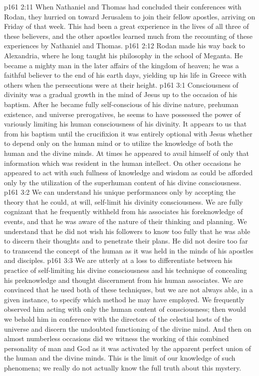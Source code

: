 \vs p161 2:11 \pc When Nathaniel and Thomas had concluded their conferences with Rodan, they hurried on toward Jerusalem to join their fellow apostles, arriving on Friday of that week. This had been a great experience in the lives of all three of these believers, and the other apostles learned much from the recounting of these experiences by Nathaniel and Thomas.
\vs p161 2:12 Rodan made his way back to Alexandria, where he long taught his philosophy in the school of Meganta. He became a mighty man in the later affairs of the kingdom of heaven; he was a faithful believer to the end of his earth days, yielding up his life in Greece with others when the persecutions were at their height.
\vs p161 3:1 Consciousness of divinity was a gradual growth in the mind of Jesus up to the occasion of his baptism. After he became fully self\hyp{}conscious of his divine nature, prehuman existence, and universe prerogatives, he seems to have possessed the power of variously limiting his human consciousness of his divinity. It appears to us that from his baptism until the crucifixion it was entirely optional with Jesus whether to depend only on the human mind or to utilize the knowledge of both the human and the divine minds. At times he appeared to avail himself of only that information which was resident in the human intellect. On other occasions he appeared to act with such fullness of knowledge and wisdom as could be afforded only by the utilization of the superhuman content of his divine consciousness.
\vs p161 3:2 We can understand his unique performances only by accepting the theory that he could, at will, self\hyp{}limit his divinity consciousness. We are fully cognizant that he frequently withheld from his associates his foreknowledge of events, and that he was aware of the nature of their thinking and planning. We understand that he did not wish his followers to know too fully that he was able to discern their thoughts and to penetrate their plans. He did not desire too far to transcend the concept of the human as it was held in the minds of his apostles and disciples.
\vs p161 3:3 We are utterly at a loss to differentiate between his practice of self\hyp{}limiting his divine consciousness and his technique of concealing his preknowledge and thought discernment from his human associates. We are convinced that he used both of these techniques, but we are not always able, in a given instance, to specify which method he may have employed. We frequently observed him acting with only the human content of consciousness; then would we behold him in conference with the directors of the celestial hosts of the universe and discern the undoubted functioning of the divine mind. And then on almost numberless occasions did we witness the working of this combined personality of man and God as it was activated by the apparent perfect union of the human and the divine minds. This is the limit of our knowledge of such phenomena; we really do not actually know the full truth about this mystery.
